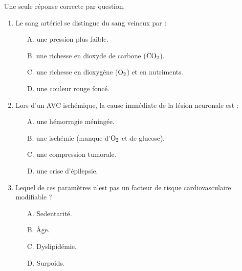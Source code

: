 \documentclass[11pt]{article}
\begin{document}
\begin{exercice}
Une seule réponse correcte par question.
\begin{enumerate}
    \item Le sang artériel se distingue du sang veineux par :
    \begin{itemize}
        \item[A.] une pression plus faible.
        \item[B.] une richesse en dioxyde de carbone ($\ce{CO2}$).
        \item[C.] une richesse en dioxygène ($\ce{O2}$) et en nutriments.
        \item[D.] une couleur rouge foncé.
    \end{itemize}
    \item Lors d'un AVC ischémique, la cause immédiate de la lésion neuronale est :
    \begin{itemize}
        \item[A.] une hémorragie méningée.
        \item[B.] une ischémie (manque d'$\ce{O2}$ et de glucose).
        \item[C.] une compression tumorale.
        \item[D.] une crise d'épilepsie.
    \end{itemize}
    \item Lequel de ces paramètres n'est pas un facteur de risque cardiovasculaire modifiable ?
    \begin{itemize}
        \item[A.] Sedentarité.
        \item[B.] Âge.
        \item[C.] Dyslipidémie.
        \item[D.] Surpoids.
    \end{itemize}
\end{enumerate}
\end{exercice}
\end{document}
